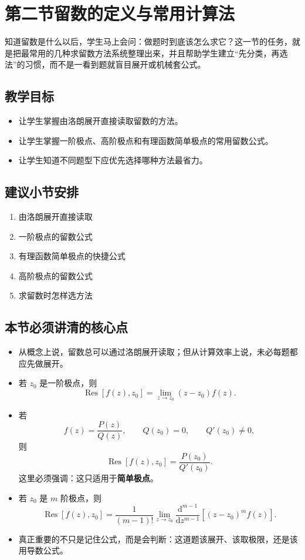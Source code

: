 \section{第二节\quad 留数的定义与常用计算法}

\begin{wulibj}[本节要解决的问题]
知道留数是什么以后，学生马上会问：做题时到底该怎么求它？这一节的任务，就是把最常用的几种求留数方法系统整理出来，并且帮助学生建立``先分类，再选法''的习惯，而不是一看到题就盲目展开或机械套公式。
\end{wulibj}

\subsection*{教学目标}
\begin{itemize}
    \item 让学生掌握由洛朗展开直接读取留数的方法。
    \item 让学生掌握一阶极点、高阶极点和有理函数简单极点的常用留数公式。
    \item 让学生知道不同题型下应优先选择哪种方法最省力。
\end{itemize}

\subsection*{建议小节安排}
\begin{enumerate}
    \item 由洛朗展开直接读取
    \item 一阶极点的留数公式
    \item 有理函数简单极点的快捷公式
    \item 高阶极点的留数公式
    \item 求留数时怎样选方法
\end{enumerate}

\subsection*{本节必须讲清的核心点}
\begin{itemize}
    \item 从概念上说，留数总可以通过洛朗展开读取；但从计算效率上说，未必每题都应先做展开。
    \item 若 $z_0$ 是一阶极点，则
    \[
        \operatorname{Res}[f(z),z_0]
        =
        \lim_{z\to z_0}(z-z_0)f(z).
    \]
    \item 若
    \[
        f(z)=\frac{P(z)}{Q(z)},\qquad Q(z_0)=0,\qquad Q'(z_0)\neq 0,
    \]
    则
    \[
        \operatorname{Res}[f(z),z_0]=\frac{P(z_0)}{Q'(z_0)}.
    \]
    这里必须强调：这只适用于\textbf{简单极点}。
    \item 若 $z_0$ 是 $m$ 阶极点，则
    \[
        \operatorname{Res}[f(z),z_0]
        =
        \frac{1}{(m-1)!}
        \lim_{z\to z_0}
        \frac{\mathrm{d}^{m-1}}{\mathrm{d}z^{m-1}}
        \left[(z-z_0)^m f(z)\right].
    \]
    \item 真正重要的不只是记住公式，而是会判断：这道题该展开、该取极限，还是该用导数公式。
\end{itemize}

